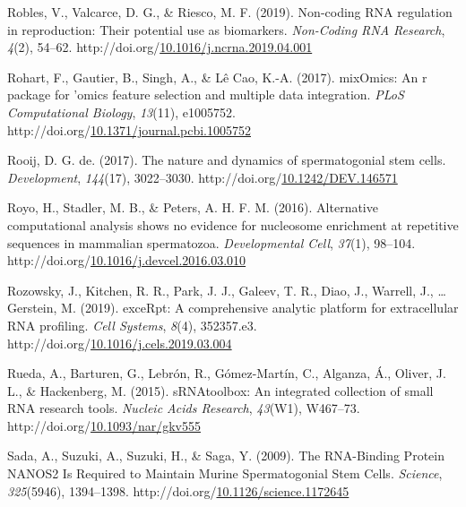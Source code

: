 \documentclass[12pt,twoside]{reedthesis}
\newlength{\cslhangindent}
\newenvironment{CSLReferences}[2] %
 {%
  \setlength{\parindent}{0pt}
  \ifodd #1 \everypar{\setlength{\hangindent}{\cslhangindent}}\ignorespaces\fi
  \ifnum #2 > 0
  \setlength{\parskip}{#2\baselineskip}
  \fi
 }%
 {}
\begin{document}
\begin{CSLReferences}{1}{0}
\leavevmode{}%
Robles, V., Valcarce, D. G., \& Riesco, M. F. (2019). Non-coding RNA regulation in reproduction: Their potential use as biomarkers. \emph{Non-Coding RNA Research}, \emph{4}(2), 54--62. http://doi.org/\href{https://doi.org/10.1016/j.ncrna.2019.04.001}{10.1016/j.ncrna.2019.04.001}

\leavevmode{}%
Rohart, F., Gautier, B., Singh, A., \& Lê Cao, K.-A. (2017). mixOmics: An r package for 'omics feature selection and multiple data integration. \emph{PLoS Computational Biology}, \emph{13}(11), e1005752. http://doi.org/\href{https://doi.org/10.1371/journal.pcbi.1005752}{10.1371/journal.pcbi.1005752}

\leavevmode{}%
Rooij, D. G. de. (2017). The nature and dynamics of spermatogonial stem cells. \emph{Development}, \emph{144}(17), 3022--3030. http://doi.org/\href{https://doi.org/10.1242/DEV.146571}{10.1242/DEV.146571}

\leavevmode{}%
Royo, H., Stadler, M. B., \& Peters, A. H. F. M. (2016). Alternative computational analysis shows no evidence for nucleosome enrichment at repetitive sequences in mammalian spermatozoa. \emph{Developmental Cell}, \emph{37}(1), 98--104. http://doi.org/\href{https://doi.org/10.1016/j.devcel.2016.03.010}{10.1016/j.devcel.2016.03.010}

\leavevmode{}%
Rozowsky, J., Kitchen, R. R., Park, J. J., Galeev, T. R., Diao, J., Warrell, J., \ldots{} Gerstein, M. (2019). exceRpt: A comprehensive analytic platform for extracellular RNA profiling. \emph{Cell Systems}, \emph{8}(4), 352357.e3. http://doi.org/\href{https://doi.org/10.1016/j.cels.2019.03.004}{10.1016/j.cels.2019.03.004}

\leavevmode{}%
Rueda, A., Barturen, G., Lebrón, R., Gómez-Martín, C., Alganza, Á., Oliver, J. L., \& Hackenberg, M. (2015). sRNAtoolbox: An integrated collection of small RNA research tools. \emph{Nucleic Acids Research}, \emph{43}(W1), W467--73. http://doi.org/\href{https://doi.org/10.1093/nar/gkv555}{10.1093/nar/gkv555}

\leavevmode{}%
Sada, A., Suzuki, A., Suzuki, H., \& Saga, Y. (2009). The RNA-Binding Protein NANOS2 Is Required to Maintain Murine Spermatogonial Stem Cells. \emph{Science}, \emph{325}(5946), 1394--1398. http://doi.org/\href{https://doi.org/10.1126/science.1172645}{10.1126/science.1172645}


\end{CSLReferences}
\end{document}
